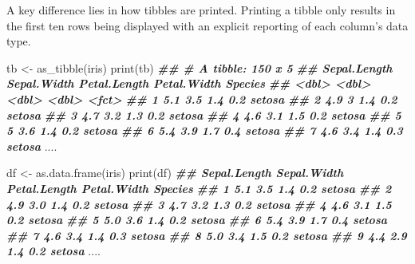 \documentclass[
]{book}
\newenvironment{Shaded}{\begin{snugshade}}{\end{snugshade}}
\newcommand{\DocumentationTok}[1]{\textcolor[rgb]{0.56,0.35,0.01}{\textbf{\textit{#1}}}}
\newcommand{\FunctionTok}[1]{\textcolor[rgb]{0.00,0.00,0.00}{#1}}
\newcommand{\NormalTok}[1]{#1}
\newcommand{\OtherTok}[1]{\textcolor[rgb]{0.56,0.35,0.01}{#1}}
\begin{document}
A key difference lies in how tibbles are printed. Printing a tibble only results in the first ten rows being displayed with an explicit reporting of each column's data type.

\begin{Shaded}
\begin{Highlighting}[]
\NormalTok{tb }\OtherTok{\textless{}{-}} \FunctionTok{as\_tibble}\NormalTok{(iris)}
\FunctionTok{print}\NormalTok{(tb)}
\DocumentationTok{\#\# \# A tibble: 150 x 5}
\DocumentationTok{\#\#    Sepal.Length Sepal.Width Petal.Length Petal.Width Species}
\DocumentationTok{\#\#           \textless{}dbl\textgreater{}       \textless{}dbl\textgreater{}        \textless{}dbl\textgreater{}       \textless{}dbl\textgreater{} \textless{}fct\textgreater{}  }
\DocumentationTok{\#\#  1          5.1         3.5          1.4         0.2 setosa }
\DocumentationTok{\#\#  2          4.9         3            1.4         0.2 setosa }
\DocumentationTok{\#\#  3          4.7         3.2          1.3         0.2 setosa }
\DocumentationTok{\#\#  4          4.6         3.1          1.5         0.2 setosa }
\DocumentationTok{\#\#  5          5           3.6          1.4         0.2 setosa }
\DocumentationTok{\#\#  6          5.4         3.9          1.7         0.4 setosa }
\DocumentationTok{\#\#  7          4.6         3.4          1.4         0.3 setosa }
\NormalTok{....}

\NormalTok{df }\OtherTok{\textless{}{-}} \FunctionTok{as.data.frame}\NormalTok{(iris)}
\FunctionTok{print}\NormalTok{(df)}
\DocumentationTok{\#\#     Sepal.Length Sepal.Width Petal.Length Petal.Width    Species}
\DocumentationTok{\#\# 1            5.1         3.5          1.4         0.2     setosa}
\DocumentationTok{\#\# 2            4.9         3.0          1.4         0.2     setosa}
\DocumentationTok{\#\# 3            4.7         3.2          1.3         0.2     setosa}
\DocumentationTok{\#\# 4            4.6         3.1          1.5         0.2     setosa}
\DocumentationTok{\#\# 5            5.0         3.6          1.4         0.2     setosa}
\DocumentationTok{\#\# 6            5.4         3.9          1.7         0.4     setosa}
\DocumentationTok{\#\# 7            4.6         3.4          1.4         0.3     setosa}
\DocumentationTok{\#\# 8            5.0         3.4          1.5         0.2     setosa}
\DocumentationTok{\#\# 9            4.4         2.9          1.4         0.2     setosa}
\NormalTok{....}
\end{Highlighting}
\end{Shaded}
\end{document}
